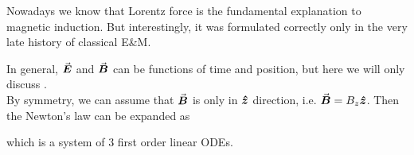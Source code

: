 \documentclass[class=article, crop=false, 12pt]{standalone}
\begin{document}
Nowadays we know that Lorentz force is the fundamental explanation to magnetic induction.
But interestingly, it was formulated correctly only in the very late history of classical E\&M.

In general, $\va*{E}$ and $\va*{B}$ can be functions of time and position,
but here we will only discuss .\\

By symmetry, we can assume that $\va*{B}$ is only in $\vu*{z}$ direction, 
i.e. $\va*{B} = B_z\vu*{z}$.
Then the Newton's  law can be expanded as

which is a system of 3 first order linear ODEs.
\end{document}

